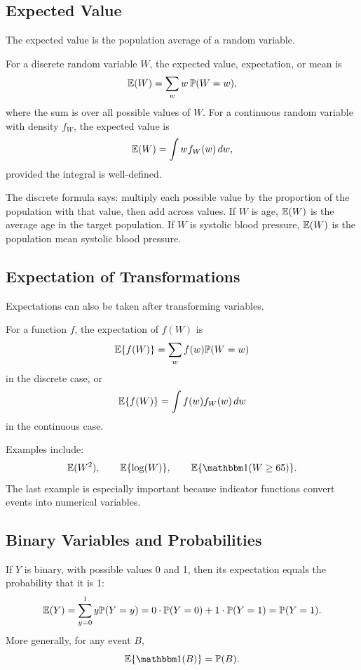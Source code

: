 \label{lec:1-5}

\subsection{Expected Value}

The expected value is the population average of a random variable.

\begin{definition}
For a discrete random variable $W$, the expected value, expectation, or mean is
\[
\mathbb{E}(W)=\sum_w w\,\mathbb{P}(W=w),
\]
where the sum is over all possible values of $W$. For a continuous random variable with density $f_W$, the expected value is
\[
\mathbb{E}(W)=\int w f_W(w)\,dw,
\]
provided the integral is well-defined.
\end{definition}

The discrete formula says: multiply each possible value by the proportion of the population with that value, then add across values. If $W$ is age, $\mathbb{E}(W)$ is the average age in the target population. If $W$ is systolic blood pressure, $\mathbb{E}(W)$ is the population mean systolic blood pressure.

\subsection{Expectation of Transformations}

Expectations can also be taken after transforming variables.

\begin{definition}
For a function $f$, the expectation of $f(W)$ is
\[
\mathbb{E}\{f(W)\}=\sum_w f(w)\mathbb{P}(W=w)
\]
in the discrete case, or
\[
\mathbb{E}\{f(W)\}=\int f(w)f_W(w)\,dw
\]
in the continuous case.
\end{definition}

Examples include:
\[
\E(W^2), \qquad \E\{\log(W)\}, \qquad \E\{\ind(W\ge 65)\}.
\]
The last example is especially important because indicator functions convert events into numerical variables.

\subsection{Binary Variables and Probabilities}

If $Y$ is binary, with possible values 0 and 1, then its expectation equals the probability that it is 1:
\[
\mathbb{E}(Y)
=\sum_{y=0}^1 y\mathbb{P}(Y=y)
=0\cdot \mathbb{P}(Y=0)+1\cdot \mathbb{P}(Y=1)
=\mathbb{P}(Y=1).
\]
More generally, for any event $B$,
\[
\E\{\ind(B)\}=\Prob(B).
\]

